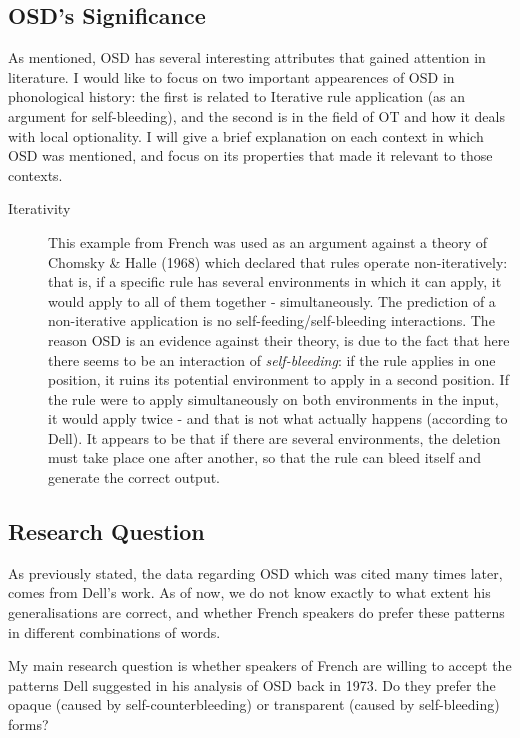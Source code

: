 \documentclass{article}
\begin{document}
\subsection{OSD's Significance} %
As mentioned, OSD has several interesting attributes that gained attention in literature.  I would like to focus on two important appearences of OSD in phonological history: the first is related to Iterative rule application (as an argument for self-bleeding),  and the second is in the field of OT and how it deals with local optionality. I will give a brief explanation on each context in which OSD was mentioned, and focus on its properties that made it relevant to those contexts.\\

\begin{description}
   \item[Iterativity] This example from French was used as an argument against a theory of Chomsky \& Halle (1968) which declared that rules operate non-iteratively: that is, if a specific rule has several environments in which it can apply, it would apply to all of them together - simultaneously.  The prediction of a non-iterative application is no self-feeding/self-bleeding interactions. The reason OSD is an evidence against their theory, is due to the fact that here there seems to be an interaction of \textit{self-bleeding}: if the rule applies in one position, it ruins its potential environment to apply in a second position. If the rule were to apply simultaneously on both environments in the input, it would apply twice - and that is not what actually happens (according to Dell). It appears to be that if there are several environments, the deletion must take place one after another, so that the rule can bleed itself and generate the correct output.
\end{description}

\subsection{Research Question} %
As previously stated, the data regarding OSD which was cited many times later, comes from Dell's work. As of now, we do not know exactly to what extent his generalisations are correct, and whether French speakers do prefer these patterns in different combinations of words.

My main research question is whether speakers of French are willing to accept the patterns Dell suggested in his analysis of OSD back in 1973.  Do they prefer the opaque (caused by self-counterbleeding) or transparent (caused by self-bleeding) forms?
\end{document}
